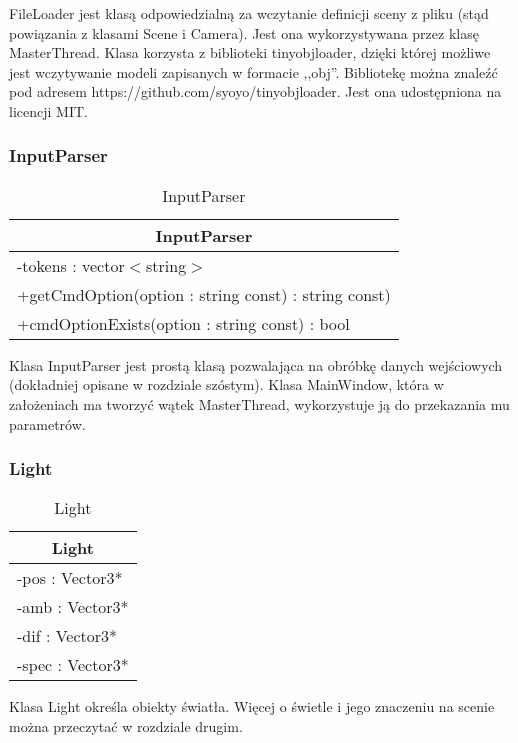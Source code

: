FileLoader jest klasą odpowiedzialną za wczytanie definicji sceny z pliku (stąd powiązania z klasami Scene i Camera). Jest ona wykorzystywana przez klasę MasterThread. Klasa korzysta z biblioteki tinyobjloader, dzięki której możliwe jest wczytywanie modeli zapisanych w formacie ,,obj''. Bibliotekę można znaleźć pod adresem https://github.com/syoyo/tinyobjloader. Jest ona udostępniona na licencji MIT.

\subsubsection{InputParser}

\footnotesize
\begin{longtable}{|p{14cm}|}
    \caption{InputParser} \label{tab:InputParser} \\ \hline
    \multicolumn{1}{|c|}{InputParser} \\ \hline
    -tokens : vector$<$string$>$  \\ \hline
    +getCmdOption(option : string const) : string const) \\
    +cmdOptionExists(option : string const) : bool \\ \hline
\end{longtable}
\normalsize

Klasa InputParser jest prostą klasą pozwalająca na obróbkę danych wejściowych (dokładniej opisane w rozdziale szóstym). Klasa MainWindow, która w założeniach ma tworzyć wątek MasterThread, wykorzystuje ją do przekazania mu parametrów.

\subsubsection{Light}

\footnotesize
\begin{longtable}{|p{14cm}|}
    \caption{Light} \label{tab:Light} \\ \hline
    \multicolumn{1}{|c|}{Light} \\ \hline
    -pos : Vector3* \\ 
    -amb : Vector3* \\
    -dif : Vector3* \\
    -spec : Vector3* \\
	\hline
\end{longtable}
\normalsize

Klasa Light określa obiekty światła. Więcej o świetle i jego znaczeniu na scenie można przeczytać w rozdziale drugim.

